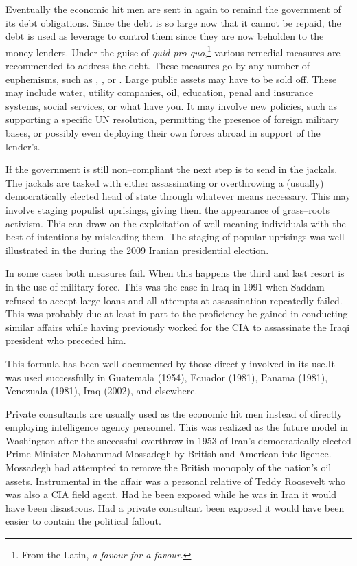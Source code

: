 Eventually the economic hit men are sent in again to remind the government of its debt obligations. Since the debt is so large now that it cannot be repaid, the debt is used as leverage to control them since they are now beholden to the money lenders. Under the guise of {\it quid pro quo},\footnote{From the Latin, {\it a favour for a favour}.} various remedial measures are recommended to address the debt. These measures go by any number of euphemisms, such as , , or . Large public assets may have to be sold off. These may include water, utility companies, oil, education, penal and insurance systems, social services, or what have you. It may involve new policies, such as supporting a specific UN resolution, permitting the presence of foreign military bases, or possibly even deploying their own forces abroad in support of the lender's.

If the government is still non--compliant the next step is to send in the jackals. The jackals are tasked with either assassinating or overthrowing a (usually) democratically elected head of state through whatever means necessary. This may involve staging populist uprisings, giving them the appearance of grass--roots activism. This can draw on the exploitation of well meaning individuals with the best of intentions by misleading them. The staging of popular uprisings was well illustrated in the  during the 2009 Iranian presidential election.\footnotecite[hersh2008]\footnotecite[ross2007]

In some cases both measures fail. When this happens the third and last resort is in the use of military force. This was the case in Iraq in 1991 when Saddam refused to accept large loans and all attempts at assassination repeatedly failed. This was probably due at least in part to the proficiency he gained in conducting similar affairs while having previously worked for the CIA to assassinate the Iraqi president who preceded him.

This formula has been well documented by those directly involved in its use.\footnotecite[perkins2005] It was used successfully in Guatemala (1954), Ecuador (1981), Panama (1981), Venezuala (1981), Iraq (2002), and elsewhere.

Private consultants are usually used as the economic hit men instead of directly employing intelligence agency personnel. This was realized as the future model in Washington after the successful overthrow in 1953 of Iran's democratically elected Prime Minister Mohammad Mossadegh by British and American intelligence. Mossadegh had attempted to remove the British monopoly of the nation's oil assets. Instrumental in the affair was a personal relative of Teddy Roosevelt who was also a CIA field agent. Had he been exposed while he was in Iran it would have been disastrous. Had a private consultant been exposed it would have been easier to contain the political fallout.

